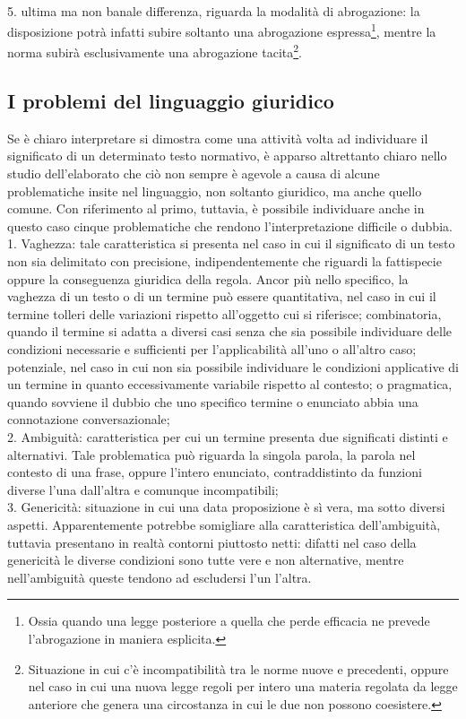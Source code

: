 \\5. ultima ma non banale differenza, riguarda la modalità di abrogazione: la disposizione potrà infatti subire soltanto una abrogazione espressa\footnote{Ossia quando una legge posteriore a quella che perde efficacia ne prevede l'abrogazione in maniera esplicita.}, mentre la norma subirà esclusivamente una abrogazione tacita\footnote{Situazione in cui c'è incompatibilità tra le norme nuove e precedenti, oppure nel caso in cui una nuova legge regoli per intero una materia regolata da legge anteriore che genera una circostanza in cui le due non possono coesistere.}. 
\subsection{I problemi del linguaggio giuridico}
Se è chiaro interpretare si dimostra come una attività volta ad individuare il significato di un determinato testo normativo, è apparso altrettanto chiaro nello studio dell'elaborato che ciò non sempre è agevole a causa di alcune problematiche insite nel linguaggio, non soltanto giuridico, ma anche quello comune.
Con riferimento al primo, tuttavia, è possibile individuare anche in questo caso cinque problematiche che rendono l'interpretazione difficile o dubbia.
\\1. Vaghezza: tale caratteristica si presenta nel caso in cui il significato di un testo non sia delimitato con precisione, indipendentemente che riguardi la fattispecie oppure la conseguenza giuridica della regola. 
Ancor più nello specifico, la vaghezza di un testo o di un termine può essere quantitativa, nel caso in cui  il termine tolleri delle variazioni rispetto all'oggetto cui si riferisce; combinatoria, quando il termine si adatta a diversi casi senza che sia possibile individuare delle condizioni necessarie e sufficienti per l'applicabilità all'uno o all'altro caso; potenziale, nel caso in cui non sia possibile individuare le condizioni applicative di un termine in quanto eccessivamente variabile rispetto al contesto; o pragmatica, quando sovviene il dubbio che uno specifico termine o enunciato abbia una connotazione conversazionale;
\\2. Ambiguità: caratteristica per cui un termine presenta due significati distinti e alternativi. Tale problematica può riguarda la singola parola, la parola nel contesto di una frase, oppure l'intero enunciato, contraddistinto da funzioni diverse l'una dall'altra e comunque incompatibili;
\\3. Genericità: situazione in cui una data proposizione è sì vera, ma sotto diversi aspetti. Apparentemente potrebbe somigliare alla caratteristica dell'ambiguità, tuttavia presentano in realtà contorni piuttosto netti: difatti nel caso della genericità le diverse condizioni sono tutte vere e non alternative, mentre nell'ambiguità queste tendono ad escludersi l'un l'altra.
